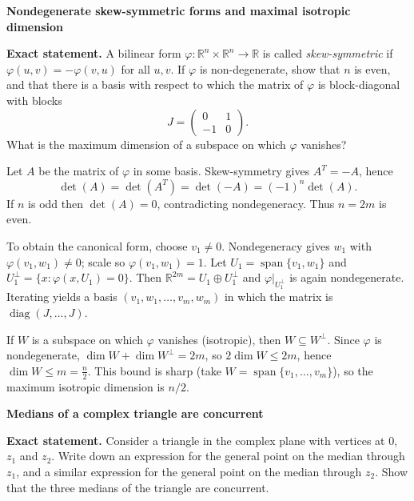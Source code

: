 \begin{problem}[CP-I-0072]
\label{prob:cp-i-0072}
\textbf{Nondegenerate skew-symmetric forms and maximal isotropic dimension}

\textbf{Exact statement.}
\hspace*{1.5em}A bilinear form $\varphi:\mathbb R^n\times\mathbb R^n\to\mathbb R$ is called \emph{skew-symmetric} if $\varphi(u,v)=-\varphi(v,u)$ for all $u,v$.
If $\varphi$ is non-degenerate, show that $n$ is even, and that there is a basis with respect to which the matrix of $\varphi$ is block-diagonal with blocks
\[
J=\begin{pmatrix}0&1\\-1&0\end{pmatrix}.
\]
What is the maximum dimension of a subspace on which $\varphi$ vanishes?

\end{problem}

\begin{solution}
Let $A$ be the matrix of $\varphi$ in some basis. Skew-symmetry gives $A^T=-A$, hence
\[
\det(A)=\det(A^T)=\det(-A)=(-1)^n\det(A).
\]
If $n$ is odd then $\det(A)=0$, contradicting nondegeneracy. Thus $n=2m$ is even.

To obtain the canonical form, choose $v_1\neq 0$. Nondegeneracy gives $w_1$ with $\varphi(v_1,w_1)\neq 0$; scale so $\varphi(v_1,w_1)=1$.
Let $U_1=\operatorname{span}\{v_1,w_1\}$ and $U_1^\perp=\{x:\varphi(x,U_1)=0\}$.
Then $\mathbb R^{2m}=U_1\oplus U_1^\perp$ and $\varphi|_{U_1^\perp}$ is again nondegenerate.
Iterating yields a basis $(v_1,w_1,\dots,v_m,w_m)$ in which the matrix is $\operatorname{diag}(J,\dots,J)$.

If $W$ is a subspace on which $\varphi$ vanishes (isotropic), then $W\subseteq W^\perp$.
Since $\varphi$ is nondegenerate, $\dim W+\dim W^\perp=2m$, so $2\dim W\le 2m$, hence $\dim W\le m=\frac n2$.
This bound is sharp (take $W=\operatorname{span}\{v_1,\dots,v_m\}$), so the maximum isotropic dimension is $n/2$.
\end{solution}

\begin{problem}[CP-I-0074]
\label{prob:cp-i-0074}
\textbf{Medians of a complex triangle are concurrent}

\textbf{Exact statement.}
\hspace*{1.5em}Consider a triangle in the complex plane with vertices at \(0\), \(z_1\) and \(z_2\). Write down an expression for the
general point on the median through \(z_1\), and a similar expression for the general point on the median through \(z_2\).
Show that the three medians of the triangle are concurrent.

\end{problem}

